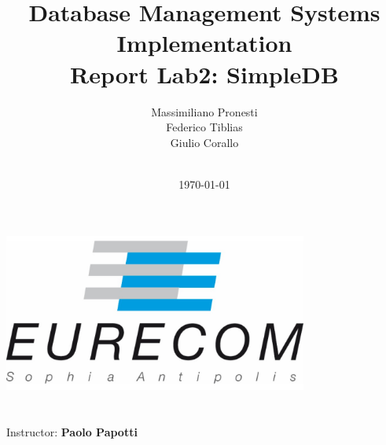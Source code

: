 \title{\Large Database Management Systems Implementation  \\[0.5cm]
	\bf\Large Report Lab2: SimpleDB }
\author{\large Massimiliano Pronesti\\ Federico Tiblias \\ Giulio Corallo \\ \ \\}
\date{\large \today}

\makeatletter
\begin{titlepage}
	\begin{center}
		{ \includegraphics[width=10cm]{../../eurecom.png}}
		{\ \\ \ \\}
		\vbox{}\vspace{5cm}
		{\@title }\\[3cm] 
		{\@author}
		{\large Instructor: \bf Paolo Papotti\\ \ \\}
		{\@date\\}
		
	\end{center}
\end{titlepage}
\makeatother
